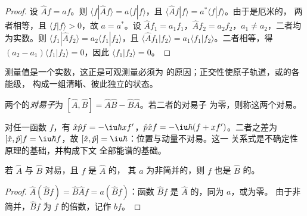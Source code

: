 \begin{proof}
设 $\hat Af = af$。则 $\langle f|\hat Af\rangle = a\langle f|f\rangle$，且
$\langle\hat Af|f\rangle = a^*\langle f|f\rangle$。由于是厄米的，
两者相等，且 $\langle f|f\rangle > 0$，故 $a = a^*$。设 $\hat Af_1
= a_1f_1$，$\hat Af_2 = a_2f_2$，$a_1 \ne a_2$，二者均为实数。则
$\langle f_1|\hat Af_2\rangle = a_2\langle f_1|f_2\rangle$，且 $\langle\hat Af_1|
f_2\rangle = a_1\langle f_1|f_2\rangle$。二者相等，得 $(a_2 - a_1)
\langle f_1|f_2\rangle = 0$，因此 $\langle f_1|f_2\rangle = 0$。
\end{proof}

测量值是一个实数，这正是可观测量必须为
的原因；正交性使原子轨道，或的各能级，
构成一组清晰、彼此独立的状态。

\begin{definition}[对易子]\label{def:b3:quantum-model-systems:commutator}
两个的\emph{对易子}为 $[\hat A,\hat B] =
\hat A\hat B - \hat B\hat A$。若二者的对易子
为零，则称这两个对易。
\end{definition}

\begin{example}[正则对易子]\label{ex:b3:quantum-model-systems:canonical}
对任一函数 $f$，有 $\hat x\hat pf = -\iu\hbar xf'$，$\hat p\hat xf =
-\iu\hbar(f + xf')$。二者之差为 $[\hat x,\hat p]f = \iu\hbar f$，故
$[\hat x,\hat p] = \iu\hbar$：位置与动量不对易。这一
关系式是不确定性原理的基础，并构成下文
全部能谱的基础。
\end{example}

\begin{proposition}[对易算符]\label{prop:b3:quantum-model-systems:commuting}
若 $\hat A$ 与 $\hat B$ 对易，且 $f$ 是 $\hat A$ 的，
其 $a$ 为非简并的，则 $f$ 也是
$\hat B$ 的。
\end{proposition}

\begin{proof}
$\hat A(\hat Bf) = \hat B\hat Af = a(\hat Bf)$：函数 $\hat Bf$ 是
$\hat A$ 的，同为 $a$，或为零。
由于非简并，$\hat Bf$ 为 $f$ 的倍数，记作 $bf$。
\end{proof}

